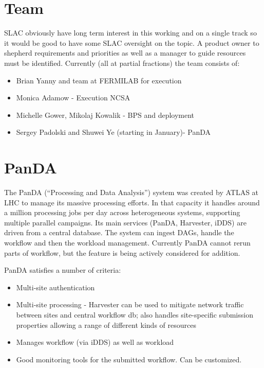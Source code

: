 \section {Team }\label{sec:team}
SLAC obviously have long term interest in this working and on a single track so it would be good to have some SLAC oversight on the topic.
A product owner to shepherd requirements and priorities as well as  a manager to guide resources must be identified.
 Currently (all at partial fractions) the team consists of:
\begin{itemize}
\item Brian Yanny and team at FERMILAB for execution
\item Monica Adamow - Execution NCSA
\item Michelle Gower, Mikolaj Kowalik  - BPS and deployment
\item Sergey Padolski and Shuwei Ye (starting in January)- PanDA
\end{itemize}



\section{PanDA}

The PanDA (``Processing and Data Analysis'') system was created by
ATLAS at LHC to manage its massive processing efforts. In that
capacity it handles  around a million  processing jobs per day
across heterogeneous systems, supporting multiple parallel
campaigns. Its main services (PanDA, Harvester, iDDS) are driven from
a central database. The system can ingest DAGs, handle the workflow
and then the workload management. Currently PanDA cannot rerun parts
of workflow, but the feature is being actively considered for addition.

PanDA satisfies a number of criteria:
\begin{itemize}
\item Multi-site authentication
\item Multi-site processing - Harvester can be used to mitigate network traffic between sites and central workflow db; also handles site-specific submission properties allowing a range of different kinds of resources
\item Manages workflow (via iDDS) as well as workload
\item Good monitoring tools for the submitted workflow. Can be customized.
\end{itemize}

